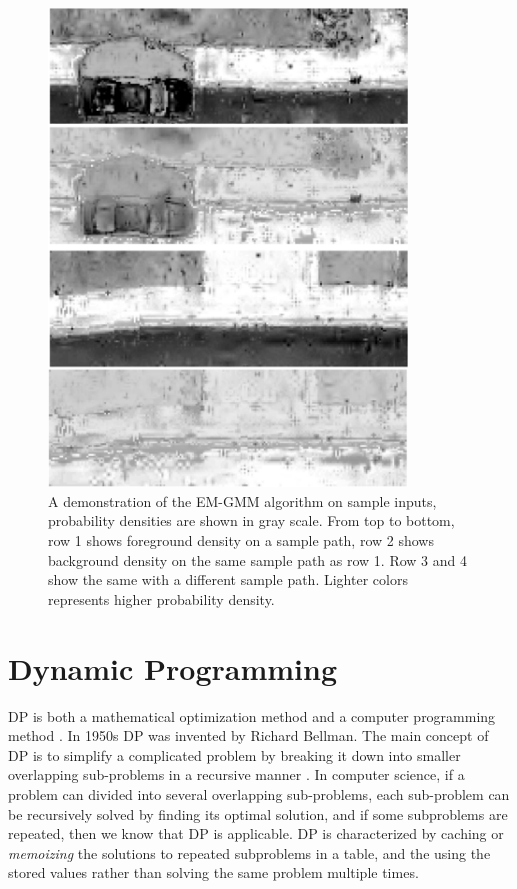 \begin{figure}[H]
\centering
\includegraphics[width=0.85\textwidth]{Figures/GMM_needed.png}
\caption[Density Background Subtraction]{
A demonstration of the \ac{EM-GMM} algorithm on sample inputs, probability densities are shown in gray scale. 
From top to bottom, row 1 shows foreground density on a sample path, row 2 shows background density on 
the same sample path as row 1. 
Row 3 and 4 show the same with a different sample path. 
Lighter colors represents higher probability density.}
\label{fig:gmm_sample_1}
\end{figure}

\section{Dynamic Programming}\label{sec:dp}

\acf{DP} is both a mathematical optimization method and a computer programming method \cite{bertsekas2005dynamic}. 
In 1950s \ac{DP} was invented by Richard Bellman\cite{bellman2013dynamic}. 
The main concept of \ac{DP} is to simplify a complicated problem by breaking it down into smaller overlapping sub-problems
 in a recursive manner \cite{howard1966dynamic}. 
In computer science, if a problem can divided into several overlapping sub-problems, 
each sub-problem can be recursively solved by finding its optimal solution, and if some subproblems are repeated, then 
we know that \ac{DP} is applicable. \ac{DP} is characterized by caching or \textit{memoizing}
 the solutions to repeated subproblems in a table, and the using the stored values rather than solving
 the same problem multiple times.  

